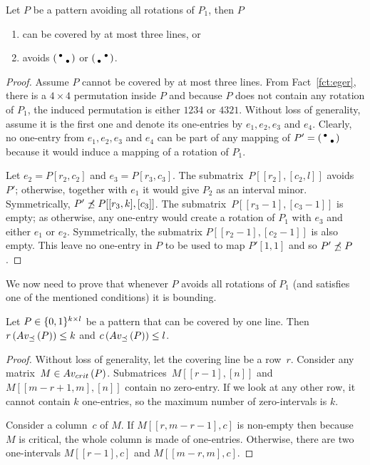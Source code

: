 \begin{thm}
\label{thm:boundedints}
Let $P$ be a pattern avoiding all rotations of $P_1$, then $P$
\begin{enumerate}
	\item can be covered by at most three lines, or
	\item avoids $\left(\begin{smallmatrix}\bullet& \\ &\bullet\end{smallmatrix}\right)$ or $\left(\begin{smallmatrix} &\bullet\\\bullet& \end{smallmatrix}\right)$.
\end{enumerate}
\end{thm}
\begin{proof}
Assume $P$ cannot be covered by at most three lines. From Fact~\ref{fct:eger}, there is a $4\times4$ permutation inside $P$ and because $P$ does not contain any rotation of $P_1$, the induced permutation is either $1234$ or $4321$. Without loss of generality, assume it is the first one and denote its one-entries by $e_1,e_2,e_3$ and $e_4$. Clearly, no one-entry from $e_1,e_2,e_3$ and $e_4$ can be part of any mapping of $P'=\left(\begin{smallmatrix}\bullet& \\ &\bullet\end{smallmatrix}\right)$ because it would induce a mapping of a rotation of $P_1$.

Let $e_2=P[r_2,c_2]$ and $e_3=P[r_3,c_3]$. The submatrix~$P[[r_2],[c_2,l]]$ avoids $P'$; otherwise, together with $e_1$ it would give $P_2$ as an interval minor. Symmetrically, $P'\not\preceq P[[r_3,k],[c_3]]$. The submatrix~$P[[r_3-1],[c_3-1]]$ is empty; as otherwise, any one-entry would create a rotation of $P_1$ with $e_3$ and either $e_1$ or $e_2$. Symmetrically, the submatrix $P[[r_2-1],[c_2-1]]$ is also empty. This leave no one-entry in $P$ to be used to map $P'[1,1]$ and so $P'\not\preceq P$.
\end{proof}

We now need to prove that whenever $P$ avoids all rotations of $P_1$ (and satisfies one of the mentioned conditions) it is bounding.

\begin{lemma}
Let $P\in\{0,1\}^{k\times l}$ be a pattern that can be covered by one line. Then $r\left(Av_{\preceq}\left(P\right)\right)\leq k$ and $c\left(Av_{\preceq}\left(P\right)\right)\leq l$.
\end{lemma}
\begin{proof}
Without loss of generality, let the covering line be a row~$r$. Consider any matrix~$M\in Av_{crit}\left(P\right)$. Submatrices~$M[[r-1],[n]]$ and $M[[m-r+1,m],[n]]$ contain no zero-entry. If we look at any other row, it cannot contain $k$ one-entries, so the maximum number of zero-intervals is $k$.

Consider a column~$c$ of $M$. If $M[[r,m-r-1],c]$ is non-empty then because $M$ is critical, the whole column is made of one-entries. Otherwise, there are two one-intervals $M[[r-1],c]$ and $M[[m-r,m],c]$.
\end{proof}

